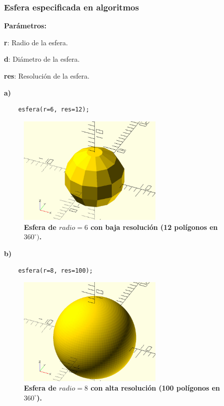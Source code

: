 \clearpage
\subsubsection{Esfera especificada en algoritmos}

\begin{description}
\item \textbf{Parámetros:}
\item  \textbf{r}: Radio de la esfera.
\item  \textbf{d}: Diámetro de la esfera.
\item  \textbf{res}: Resolución de la esfera.
\end{description}

\textbf{a)} 

\begin{verbatim}
    esfera(r=6, res=12); 
\end{verbatim}


\begin{figure}[h]
\includegraphics[width=7cm]{Img/Modelos/modelado3.jpg}
\centering
\caption{\textbf{\footnotesize{Esfera de $radio=6$ con baja resolución (12 polígonos en $360^\circ)$. }}}
\end{figure}

\textbf{b)} 

\begin{verbatim}
    esfera(r=8, res=100); 
\end{verbatim}

\begin{figure}[h]
\includegraphics[width=7cm]{Img/Modelos/modelado4.jpg}
\centering
\caption{\textbf{ \footnotesize{Esfera de $radio=8$ con alta resolución (100 polígonos en $360^\circ$).}}}
\end{figure}

